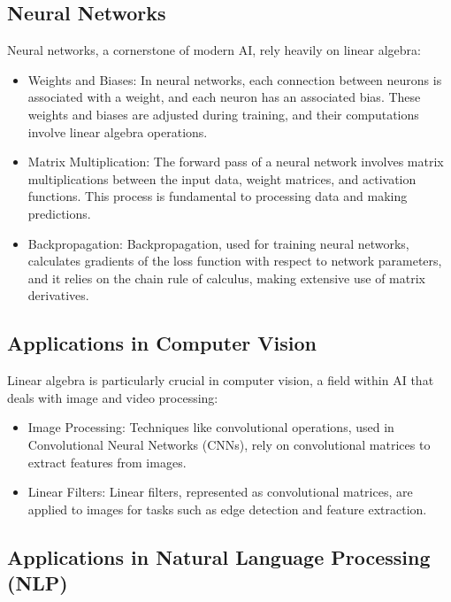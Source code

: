 \documentclass[conference]{IEEEtran}
\begin{document}
\subsection{Neural Networks}

Neural networks, a cornerstone of modern AI, rely heavily on linear algebra:
\begin{itemize}
  \item Weights and Biases: In neural networks, each connection between neurons is associated with a weight, and each neuron has an associated bias. These weights and biases are adjusted during training, and their computations involve linear algebra operations.

  \item Matrix Multiplication: The forward pass of a neural network involves matrix multiplications between the input data, weight matrices, and activation functions. This process is fundamental to processing data and making predictions.

  \item Backpropagation: Backpropagation, used for training neural networks, calculates gradients of the loss function with respect to network parameters, and it relies on the chain rule of calculus, making extensive use of matrix derivatives.
\end{itemize}

\subsection{Applications in Computer Vision}

Linear algebra is particularly crucial in computer vision, a field within AI that deals with image and video processing:
\begin{itemize}
  \item Image Processing: Techniques like convolutional operations, used in Convolutional Neural Networks (CNNs), rely on convolutional matrices to extract features from images.

  \item Linear Filters: Linear filters, represented as convolutional matrices, are applied to images for tasks such as edge detection and feature extraction.
\end{itemize}


\subsection{Applications in Natural Language Processing (NLP)}
\end{document}

